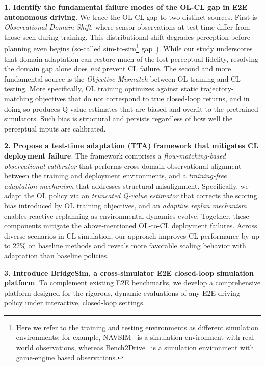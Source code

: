 \documentclass{article}
\begin{document}
\textbf{1. Identify the fundamental failure modes of the OL-CL gap in E2E autonomous driving}. We trace the OL-CL gap to two distinct sources. First is \textit{Observational Domain Shift}, where sensor observations at test time differ from those seen during training. This distributional shift degrades perception before planning even begins (so-called sim-to-sim\footnote{Here we refer to the training and testing environments as different simulation environments: for example, NAVSIM~\cite{navsimv1,navsimv2} is a simulation environment with real-world observations, whereas Bench2Drive~\cite{jia2024bench} is a simulation environment with game-engine based observations.} gap~\cite{garcia2025road}). While our study underscores that domain adaptation can restore much of the lost perceptual fidelity, resolving the domain gap alone does \textit{not} prevent CL failure. The second and more fundamental source is the \textit{Objective Mismatch} between OL training and CL testing. More specifically, OL training optimizes against static trajectory-matching objectives that do not correspond to true closed-loop returns, and in doing so produces Q-value estimates that are biased and overfit to the pretrained simulators. Such bias is structural and persists regardless of how well the perceptual inputs are calibrated. 

\textbf{2. Propose a test-time adaptation (TTA) framework that mitigates CL deployment failure}. The framework comprises a \textit{flow-matching-based observational calibrator} that performs cross-domain observational alignment between the training and deployment environments, and a \textit{training-free adaptation mechanism} that addresses structural misalignment. Specifically, we adapt the OL policy via an \textit{truncated Q-value estimator} that corrects the scoring bias introduced by OL training objectives, and an \textit{adaptive replan mechanism} enables reactive replanning as environmental dynamics evolve. Together, these components mitigate the above-mentioned OL-to-CL deployment failures. Across diverse scenarios in CL simulation, our approach improves CL performance by up to 22\% on baseline methods and reveals more favorable scaling behavior with adaptation than baseline policies. 

\textbf{3. Introduce BridgeSim, a cross-simulator E2E closed-loop simulation platform}. To complement existing E2E benchmarks, we develop a comprehensive platform designed for the rigorous, dynamic evaluations of any E2E driving policy under interactive, closed-loop settings.
\end{document}
